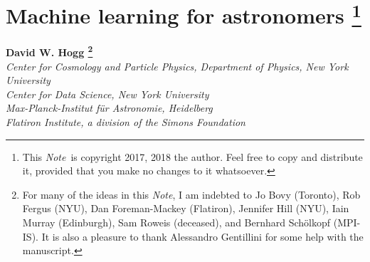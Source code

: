 \documentclass[12pt, twoside, letterpaper]{article}
\newcommand{\thistitle}{Machine learning for astronomers}
\newcommand{\documentname}{\textsl{Note}}
\begin{document}
\sloppy\sloppypar\raggedbottom\frenchspacing\thispagestyle{empty} %

\section*{\thistitle%
\footnote{This \documentname\ is copyright 2017, 2018 the author. Feel free to copy and
distribute it, provided that you make no changes to it whatsoever.}}

\noindent
\textbf{David W. Hogg%
\footnote{For many of the ideas in this \documentname, I am indebted to
  Jo Bovy (Toronto),
  Rob Fergus (NYU),
  Dan Foreman-Mackey (Flatiron),
  Jennifer Hill (NYU),
  Iain Murray (Edinburgh),
  Sam Roweis (deceased),
  and
  Bernhard Sch\"olkopf (MPI-IS).
It is also a pleasure to thank
  Alessandro Gentillini for some help with the manuscript.}}\\
\textsl{\footnotesize
  Center for Cosmology and Particle Physics, Department of Physics, New York University \\
  Center for Data Science, New York University \\
  Max-Planck-Institut f\"ur Astronomie, Heidelberg \\
  Flatiron Institute, a division of the Simons Foundation}
\end{document}
